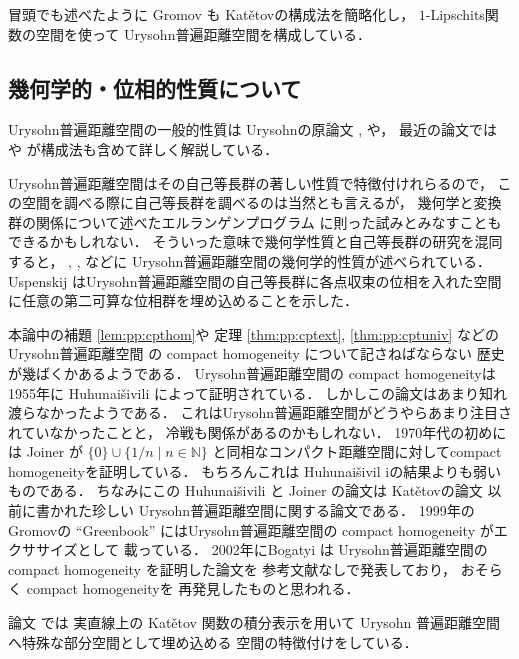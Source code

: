 \documentclass[leqno, 12pt]{jsarticle}
\newcommand{\nn}{\mathbb{N}}
\begin{document}
冒頭でも述べたように
Gromov 
\cite{Greenbook}
も
Kat\v{e}tovの構成法を簡略化し，
$1$-Lipschits関数の空間を使って
Urysohn普遍距離空間を構成している．




\subsection{幾何学的・位相的性質について}

Urysohn普遍距離空間の一般的性質は
Urysohnの原論文 
\cite{Ury1}, 
\cite{Ury2}や，
最近の論文では
\cite{Mell2007}
や
\cite{Mell2008}
が構成法も含めて詳しく解説している．



Urysohn普遍距離空間はその自己等長群の著しい性質で特徴付けれらるので，
この空間を調べる際に自己等長群を調べるのは当然とも言えるが，
幾何学と変換群の関係について述べたエルランゲンプログラム
に則った試みとみなすこともできるかもしれない．
そういった意味で幾何学性質と自己等長群の研究を混同すると，
\cite{Mell2007}, 
\cite{Mell2008},
 \cite{GK}などに
Urysohn普遍距離空間の幾何学的性質が述べられている．
Uspenskij 
\cite{Usp}
はUrysohn普遍距離空間の自己等長群に各点収束の位相を入れた空間に任意の第二可算な位相群を埋め込めることを示した．

本論中の補題
 \ref{lem:pp:cpthom}や
 定理 
 \ref{thm:pp:cptext}, 
\ref{thm:pp:cptuniv}
などの
Urysohn普遍距離空間
の
compact homogeneity
について記さねばならない
歴史が幾ばくかあるようである．
Urysohn普遍距離空間の
compact homogeneityは
1955年に
Huhunai\v{s}ivili
 \cite{huhu}
 によって証明されている．
しかしこの論文はあまり知れ渡らなかったようである．
これはUrysohn普遍距離空間がどうやらあまり注目されていなかったことと，
冷戦も関係があるのかもしれない．
1970年代の初めには
Joiner 
\cite{J}が
$\{0\}\cup\{1/n\mid n\in \nn\}$
と同相なコンパクト距離空間に対してcompact homogeneityを証明している．
もちろんこれは
Huhunai\v{s}ivil
iの結果よりも弱いものである．
ちなみにこの
Huhunai\v{s}ivili
と
Joiner
の論文は
Kat\v{e}tovの論文 \cite{Ka}
以前に書かれた珍しい
Urysohn普遍距離空間に関する論文である．
1999年のGromovの
``Greenbook'' \cite{Greenbook}
にはUrysohn普遍距離空間の
compact homogeneity
がエクササイズとして
載っている．
2002年にBogatyi 
\cite{Bogatyi}は
Urysohn普遍距離空間の
compact homogeneity
を証明した論文を
参考文献なしで発表しており，
おそらく
compact homogeneityを
再発見したものと思われる．


論文 \cite{Nie}では
実直線上の
Kat\v{e}tov
関数の積分表示を用いて
Urysohn
普遍距離空間へ特殊な部分空間として埋め込める
空間の特徴付けをしている．
\end{document}

